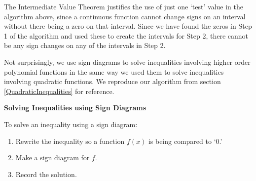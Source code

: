 \documentclass{ximera}
\begin{document}

The Intermediate Value Theorem justifies the use of just one `test' value in the algorithm above, since a continuous function cannot change signs on an interval without there being a zero on that interval.  Since we have found the zeros in Step 1 of the algorithm and used these to create the intervals for Step 2, there cannot be any sign changes on any of the intervals in Step 2.

Not surprisingly, we use sign diagrams to solve inequalities involving higher order polynomial functions in the same way we used them to solve inequalities involving quadratic functions. We reproduce our algorithm from section \ref{QuadraticInequalities} for reference.



\centerline{\textbf{Solving Inequalities using Sign Diagrams}} 

To solve an inequality using a sign diagram:

\begin{enumerate}

\item  Rewrite the inequality so a function $f(x)$ is being compared to `$0$.'

\item  Make a sign diagram for $f$.

\item  Record the solution.

\end{enumerate}

\end{document}
